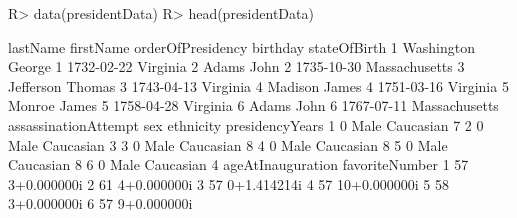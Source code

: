 \documentclass[article,shortnames]{jss}
\begin{document}
\begin{Schunk}
\begin{Sinput}
R> data(presidentData)
R> head(presidentData)
\end{Sinput}
\begin{Soutput}
    lastName firstName orderOfPresidency   birthday  stateOfBirth
1 Washington    George                 1 1732-02-22      Virginia
2      Adams      John                 2 1735-10-30 Massachusetts
3  Jefferson    Thomas                 3 1743-04-13      Virginia
4    Madison     James                 4 1751-03-16      Virginia
5     Monroe     James                 5 1758-04-28      Virginia
6      Adams      John                 6 1767-07-11 Massachusetts
  assassinationAttempt  sex ethnicity presidencyYears
1                    0 Male Caucasian               7
2                    0 Male Caucasian               3
3                    0 Male Caucasian               8
4                    0 Male Caucasian               8
5                    0 Male Caucasian               8
6                    0 Male Caucasian               4
  ageAtInauguration favoriteNumber
1                57    3+0.000000i
2                61    4+0.000000i
3                57    0+1.414214i
4                57   10+0.000000i
5                58    3+0.000000i
6                57    9+0.000000i
\end{Soutput}
\end{Schunk}
\end{document}
